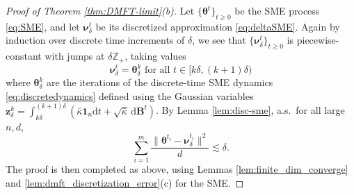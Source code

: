\documentclass[11pt,letterpaper,reqno]{amsart}
\theoremstyle{definition}
\def\d{\mathrm{d}}
\def\Z{\mathbb{Z}}
\def\z{\mathbf{z}}
\def\B{\mathbf{B}}
\def\1{\mathbf{1}}
\def\btheta{\boldsymbol{\theta}}
\def\bnu{\boldsymbol{\nu}}
\begin{document}
\begin{proof}[Proof of Theorem \ref{thm:DMFT-limit}(b)]
Let $\{\btheta^t\}_{t \geq 0}$ be the SME process \eqref{eq:SME}, and let
$\bnu_\delta^t$ be its discretized approximation \eqref{eq:deltaSME}.
Again by induction over discrete time increments of $\delta$, we see that
$\{\bnu_\delta^t\}_{t \geq 0}$
is piecewise-constant with jumps at $\delta\Z_+$, taking values
\begin{equation}\label{eq:nudeltaembedding-SME}
\bnu_\delta^t=\btheta_\delta^k \text{ for all } t \in [k\delta,(k+1)\delta)
\end{equation}
where $\btheta_\delta^k$ are the iterations of the discrete-time SME dynamics
\eqref{eq:discretedynamics} defined using the Gaussian variables
$\z_\delta^k=\int_{k\delta}^{(k+1)\delta} (\bar\kappa\1_n\d t
+\sqrt{\bar\kappa}\,\d\B^t)$. 
By Lemma \ref{lem:disc-sme}, a.s.\ for all large $n,d$,
\[\sum_{i=1}^m \frac{\|\btheta^{t_i}-\bnu_\delta^{t_i}\|^2}{d} \lesssim
\delta.\]
The proof is then completed as above, using 
Lemmas \ref{lem:finite_dim_converge} and
\ref{lem:dmft_discretization_error}(c) for the SME.
\end{proof}
\end{document}

